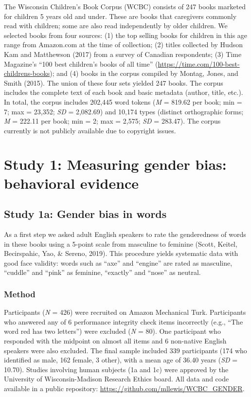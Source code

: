 \documentclass[
  english,
  ,man,floatsintext]{apa6}
\begin{document}
The Wisconsin Children's Book Corpus (WCBC) consists of 247 books marketed for children 5 years old and under. These are books that caregivers commonly read with children; some are also read independently by older children. We selected books from four sources: (1) the top selling books for children in this age range from Amazon.com at the time of collection; (2) titles collected by Hudson Kam and Matthewson (2017) from a survey of Canadian respondents; (3) Time Magazine's ``100 best children's books of all time'' (\url{https://time.com/100-best-childrens-books}); and (4) books in the corpus compiled by Montag, Jones, and Smith (2015). The union of these four sets yielded 247 books. The corpus includes the complete text of each book and basic metadata (author, title, etc.). In total, the corpus includes 202,445 word tokens (\emph{M} = 819.62 per book; min = 7; max = 23,352; \emph{SD} = 2,082.69) and 10,174 types (distinct orthographic forms; \emph{M} = 222.11 per book; min = 2; max = 2,575; \emph{SD} = 283.47). The corpus currently is not publicly available due to copyright issues.

\hypertarget{study-1-measuring-gender-bias-behavioral-evidence}{%
\section{Study 1: Measuring gender bias: behavioral evidence}\label{study-1-measuring-gender-bias-behavioral-evidence}}

\hypertarget{study-1a-gender-bias-in-words}{%
\subsection{Study 1a: Gender bias in words}\label{study-1a-gender-bias-in-words}}

As a first step we asked adult English speakers to rate the genderedness of words in these books using a 5-point scale from masculine to feminine (Scott, Keitel, Becirspahic, Yao, \& Sereno, 2019). This procedure yields systematic data with good face validity: words such as ``axe'' and ``engine'' are rated as masculine, ``cuddle'' and ``pink'' as feminine, ``exactly'' and ``nose'' as neutral.

\hypertarget{method-1}{%
\subsubsection{Method}\label{method-1}}

Participants (\emph{N} = 426) were recruited on Amazon Mechanical Turk. Participants who answered any of 6 performance integrity check items incorrectly (e.g., ``The word red has two letters'') were excluded (\emph{N} = 80). One participant who responded with the midpoint on almost all items and 6 non-native English speakers were also excluded. The final sample included 339 participants (174 who identified as male, 162 female, 3 other), with a mean age of 36.40 years (\emph{SD} = 10.70). Studies involving human subjects (1a and 1c) were approved by the University of Wisconsin-Madison Research Ethics board. All data and code available in a public repository: \url{https://github.com/mllewis/WCBC_GENDER}.
\end{document}

